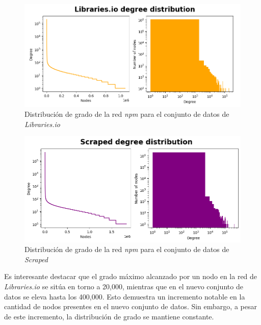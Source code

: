 \begin{figure}[ht!]
    \begin{center}
        \includegraphics[width=1\textwidth]{img/npm/ddist_l.png}
        \caption{Distribución de grado de la red \textit{npm} para el conjunto de datos de \textit{Libraries.io}}
    \end{center}
    \label{fig:npm_dd_libraries}
\end{figure}

\begin{figure}[ht!]
    \begin{center}
        \includegraphics[width=1\textwidth]{img/npm/dd_s.png}
        \caption{Distribución de grado de la red \textit{npm} para el conjunto de datos de \textit{Scraped}}
    \end{center}
    \label{fig:npm_dd_scraped}
\end{figure}

Es interesante destacar que el grado máximo alcanzado por un nodo en la red de \emph{Libraries.io} se
sitúa en torno a 20,000, mientras que en el nuevo conjunto de datos se eleva hasta los 400,000.
Esto demuestra un incremento notable en la cantidad de nodos presentes en el nuevo conjunto de datos.
Sin embargo, a pesar de este incremento, la distribución de grado se mantiene constante.

